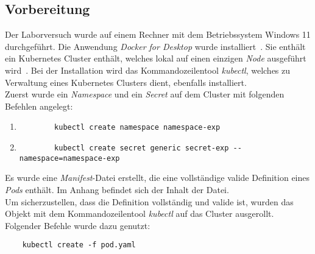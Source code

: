 \subsection{Vorbereitung}\label{subsec:preparation}
Der Laborversuch wurde auf einem Rechner mit dem Betriebssystem Windows 11 durchgeführt.
Die Anwendung \textit{Docker for Desktop} wurde installiert~\cite{docker-for-desktop-overview}. Sie enthält ein Kubernetes Cluster enthält,
welches lokal auf einen einzigen \textit{Node} ausgeführt wird~\cite{docker-for-desktop-kubernetes}.
Bei der Installation wird das Kommandozeilentool \textit{kubectl}, welches zu Verwaltung eines Kubernetes Clusters dient, ebenfalls installiert.
\\
Zuerst wurde ein \textit{Namespace} und ein \textit{Secret} auf dem Cluster mit folgenden Befehlen angelegt:
\begin{enumerate}
    \item
          \begin{verbatim}
        kubectl create namespace namespace-exp
    \end{verbatim}
    \item
          \begin{verbatim}
        kubectl create secret generic secret-exp --namespace=namespace-exp
    \end{verbatim}
\end{enumerate}
Es wurde eine \textit{Manifest}-Datei erstellt, die eine vollständige valide Definition eines \textit{Pods} enthält.
Im Anhang befindet sich der Inhalt der Datei.
\\
Um sicherzustellen, dass die Definition vollständig und valide ist, wurden das Objekt mit dem Kommandozeilentool \textit{kubectl} auf das Cluster ausgerollt.
Folgender Befehle wurde dazu genutzt:

\begin{verbatim}
    kubectl create -f pod.yaml
\end{verbatim}


